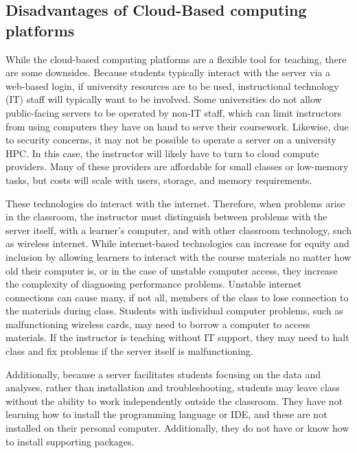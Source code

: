 \subsection{Disadvantages of Cloud-Based computing platforms}\label{subsub:cloud-disdvantage}

While the cloud-based computing platforms are a flexible tool for teaching, there are some downsides.
Because students typically interact with the server via a web-based login, if university resources are to be used, 
instructional technology (IT) staff will typically want to be involved.
Some universities do not allow public-facing servers to be operated by non-IT staff, which can 
limit instructors from using computers they have on hand to serve their coursework.
Likewise, due to security concerns, it may not be possible to operate a server on a university HPC.
In this case, the instructor will likely have to turn to cloud compute providers.
Many of these providers are affordable for small classes or low-memory tasks, but costs will scale with users, storage, and memory requirements.

These technologies do interact with the internet.
Therefore, when problems arise in the classroom, the instructor must distinguish between problems with the server itself, with a 
learner's computer, and with other classroom technology, such as wireless internet.
While internet-based technologies can increase for equity and inclusion by allowing learners to 
interact with the course materials no matter how old their computer is, or in the case of  unstable computer access, 
they increase the complexity of diagnosing performance problems.
Unstable internet connections can cause many, if not all, members of the class to lose connection to the materials during class.
Students with individual computer problems, such as malfunctioning wireless cards, may need to borrow a computer to access materials. 
If the instructor is teaching without IT support, they may need to halt class and fix problems if the server itself is malfunctioning.

Additionally, because a server facilitates students focusing on the data
and analyses, rather than installation and troubleshooting, students may leave
class without the ability to work independently outside the classroom.
They have not learning how to install the programming language or IDE, and these 
are not installed on their personal computer.
Additionally, they do not have or know how to install supporting packages.


